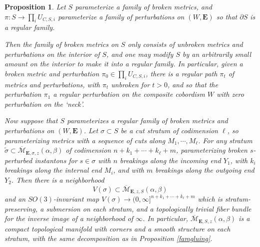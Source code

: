\documentclass{memo-l}
\newtheorem{proposition}[theorem]{Proposition}
\theoremstyle{definition}
\theoremstyle{remark}
\numberwithin{section}{chapter}
\numberwithin{equation}{chapter}
\begin{document}
\begin{proposition}\label{famcut}Let $S$ parameterize a family of broken metrics, and $\pi: S \to \prod_i U_{C,S,i}$ parameterize a family of perturbations on $(W,\mathbf{E})$ so that $\partial S$ is a regular family.

Then the family of broken metrics on $S$ only consists of unbroken metrics and perturbations on the interior of $S$, and one may modify $S$ by an arbitrarily small amount on the interior to make it into a regular family. In particular, given a broken metric and perturbation $\pi_0 \in \prod_i U_{C,S,i}$, there is a regular path $\pi_t$ of metrics and perturbations, with $\pi_t$ unbroken for $t > 0$, and so that the perturbation $\pi_1$ a regular perturbation on the composite cobordism $W$ with zero perturbation on the `neck'.

Now suppose that $S$ parameterizes a regular family of broken metrics and perturbations on $(W,\mathbf{E})$. Let $\sigma \subset S$ be a cut stratum of codimension $\ell$, so parameterizing metrics with a sequence of cuts along $M_1, \cdots, M_\ell$. For any stratum $\widetilde \sigma \subset \overline{\mathcal M}_{\mathbf{E},\sigma,z}(\alpha, \beta)$ of codimension $n + k_1 + \cdots + k_\ell + m$, parameterizing broken $s$-perturbed instantons for $s \in \sigma$ with $n$ breakings along the incoming end $Y_1$, with $k_i$ breakings along the internal end $M_i$, and with $m$ breakings along the outgoing end $Y_2$. Then there is a neighborhood $$V(\sigma) \subset \overline{\mathcal M}_{\mathbf{E},z,S}(\alpha, \beta)$$ and an $SO(3)$-invariant map $V(\sigma) \to (0,\infty]^{n+k_1 + \cdots + k_\ell +m}$ which is stratum-preserving, a submersion on each stratum, and a topologically trivial fiber bundle for the inverse image of a neighborhood of $\infty$. In particular, $\overline{\mathcal M}_{\mathbf{E},S,z}(\alpha, \beta)$ is a compact topological manifold with corners and a smooth structure on each stratum, with the same decomposition as in Proposition \ref{famgluing}.
\end{proposition}
\end{document}
